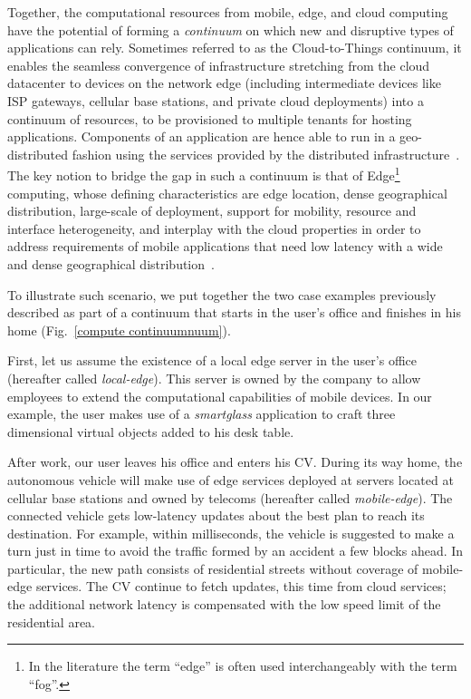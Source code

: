 Together, the computational resources from mobile, edge, and cloud computing have the potential of forming a \textit{continuum} on which new and disruptive types of applications can rely. Sometimes referred to as the Cloud-to-Things continuum, it enables the seamless convergence of infrastructure stretching from the cloud datacenter to devices on the network edge (including intermediate devices like ISP gateways, cellular base stations, and private cloud deployments) into a continuum of resources, to be provisioned to multiple tenants for hosting applications. Components of an application are hence able to run in a geo-distributed fashion using the services provided by the distributed infrastructure~\cite{GuptaIfogSim17}.   The key notion to bridge the gap in such a continuum is that of Edge\footnote{In the literature the term ``edge'' is often used interchangeably with the term ``fog''.} computing, whose defining characteristics are edge location, dense geographical distribution, large-scale of deployment, support for mobility, resource and interface heterogeneity, and interplay with the cloud properties in order to address requirements of mobile applications that need low latency with a wide and dense geographical distribution~\cite{Bonomi2014}.  

To illustrate such scenario, we put together the two case examples previously described as part of a continuum that starts in the user's office and finishes in his home (Fig.~\ref{compute continuumnuum}). 

First, let us assume the existence of a local edge server in the user's office (hereafter called \textit{local-edge}). This server is owned by the company to allow employees to extend the computational capabilities of mobile devices. In our example, the user makes use of a \textit{smartglass} application to craft three dimensional virtual objects added to his desk table.

After work, our user leaves his office and enters his CV. During its way home, the autonomous vehicle will make use of edge services deployed at servers located at cellular base stations and owned by telecoms (hereafter called \textit{mobile-edge}). The connected vehicle gets low-latency updates about the best plan to reach its destination. For example, within milliseconds, the vehicle is suggested to make a turn just in time to avoid the traffic formed by an accident a few blocks ahead. In particular, the new path consists of residential streets without coverage of mobile-edge services. The CV continue to fetch updates, this time from cloud services; the additional network latency is compensated with the low speed limit of the residential area.

